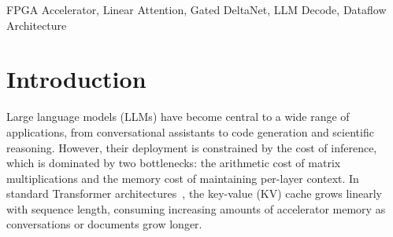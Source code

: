 \documentclass[conference]{IEEEtran}
\begin{document}
\begin{abstract}
Gated DeltaNet (GDN) is a linear attention mechanism that replaces
the growing KV cache with a fixed-size recurrent state.
Hybrid LLMs like Qwen3-Next use 75\% GDN layers and achieve
competitive accuracy to attention-only models. However, at batch-1, GDN decode is memory-bound on GPUs since the
full recurrent state must be round-tripped through HBM every token. We show that this bottleneck is
architectural, not algorithmic, as all subquadratic sequence models exhibit
arithmetic intensities below 1\,FLOP/B at decode time, making them
\emph{more} memory-bound than standard Transformers.
We present an FPGA accelerator that eliminates this bottleneck by holding
the full 2\,MB recurrent state persistently in on-chip BRAM, converting
the workload from memory-bound to compute-bound. Our design fuses the
GDN recurrence into a five-phase pipelined datapath that performs only
one read and one write pass over each state matrix per token, exploits
Grouped Value Attention for paired-head parallelism, and overlaps
preparation, computation, and output storage via dataflow pipelining.
We explore four design points on an AMD Alveo U55C using Vitis HLS,
varying head-level parallelism from 2 to 16 value-heads per iteration.
Our fastest configuration achieves 63\,$\mu$s per token, 4.5$\times$
faster than the GPU reference on NVIDIA H100 PCIe.
Post-implementation power analysis reports 9.96\,W on-chip, yielding up to
60$\times$ greater energy efficiency per token decoded.
\end{abstract}

\begin{IEEEkeywords}
FPGA Accelerator, Linear Attention, Gated DeltaNet, LLM Decode, Dataflow Architecture
\end{IEEEkeywords}

\section{Introduction}

Large language models (LLMs) have become central to a wide range of
applications, from conversational assistants to code generation and scientific
reasoning. However, their deployment is constrained by the cost of inference,
which is dominated by two bottlenecks: the arithmetic cost of matrix
multiplications and the memory cost of maintaining per-layer context. In
standard Transformer architectures~\cite{vaswani2017attention}, the key-value (KV) cache grows linearly
with sequence length, consuming increasing amounts of accelerator memory as
conversations or documents grow longer.
\end{document}
